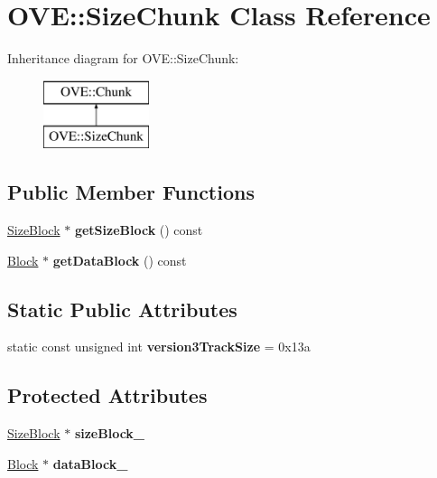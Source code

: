 \hypertarget{class_o_v_e_1_1_size_chunk}{}\section{O\+VE\+:\+:Size\+Chunk Class Reference}
\label{class_o_v_e_1_1_size_chunk}
Inheritance diagram for O\+VE\+:\+:Size\+Chunk\+:\begin{figure}[H]
\begin{center}
\leavevmode
\includegraphics[height=2.000000cm]{class_o_v_e_1_1_size_chunk}
\end{center}
\end{figure}
\subsection*{Public Member Functions}
\begin{DoxyCompactItemize}
\item 
\mbox{\label{class_o_v_e_1_1_size_chunk_a5a3a6b613ee2d76584455b74294ceeab}} 
\hyperlink{class_o_v_e_1_1_size_block}{Size\+Block} $\ast$ {\bfseries get\+Size\+Block} () const
\item 
\mbox{\label{class_o_v_e_1_1_size_chunk_a79535906905ea007e4978512eef66314}} 
\hyperlink{class_o_v_e_1_1_block}{Block} $\ast$ {\bfseries get\+Data\+Block} () const
\end{DoxyCompactItemize}
\subsection*{Static Public Attributes}
\begin{DoxyCompactItemize}
\item 
\mbox{\label{class_o_v_e_1_1_size_chunk_a73feda5528149608464ebf27ae04625c}} 
static const unsigned int {\bfseries version3\+Track\+Size} = 0x13a
\end{DoxyCompactItemize}
\subsection*{Protected Attributes}
\begin{DoxyCompactItemize}
\item 
\mbox{\label{class_o_v_e_1_1_size_chunk_ac2d4887cc97ae6e9aa15b9e4a707fd89}} 
\hyperlink{class_o_v_e_1_1_size_block}{Size\+Block} $\ast$ {\bfseries size\+Block\+\_\+}
\item 
\mbox{\label{class_o_v_e_1_1_size_chunk_abdd3f1cd80f047451650cec012b9c6f0}} 
\hyperlink{class_o_v_e_1_1_block}{Block} $\ast$ {\bfseries data\+Block\+\_\+}
\end{DoxyCompactItemize}


